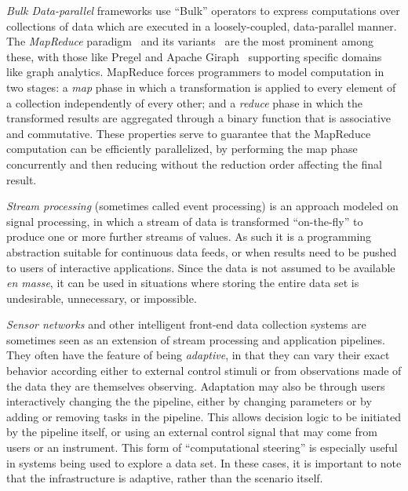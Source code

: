 {\em Bulk Data-parallel} frameworks use ``Bulk'' operators to express
computations over collections of data which are executed in a loosely-coupled,
data-parallel manner.  The {\em MapReduce} paradigm~\cite{MapReduce} and its
variants~\cite{twister,hmr} are the most prominent among these, with those like
Pregel and Apache Giraph~\cite{pregel} supporting specific domains like graph
analytics. MapReduce forces programmers to model computation in two stages: a
\emph{map} phase in which a transformation is applied to every element of a
collection independently of every other; and a \emph{reduce} phase in which the
transformed results are aggregated through a binary function that is associative
and commutative.  These properties serve to guarantee that the MapReduce
computation can be efficiently parallelized, by performing the map phase
concurrently and then reducing without the reduction order affecting the final
result.

{\em Stream processing} (sometimes called event processing) is an approach modeled 
on signal processing, in which a stream of data is transformed ``on-the-fly'' to produce one or
more further streams of values. As such it is a programming
abstraction suitable for continuous data feeds, or when results need
to be pushed to users of interactive applications. Since the data is
not assumed to be available \textit{en masse}, it can be used in
situations where storing the entire data set is undesirable,
unnecessary, or impossible. 

{\em Sensor networks} and other intelligent front-end data collection systems are sometimes seen as an extension of stream processing and application pipelines.
They often have the feature of being \emph{adaptive}, in that they can vary their exact behavior according either to external control stimuli or from observations made of the data they are 
themselves observing. Adaptation may also be through users interactively changing the
the pipeline, either by changing parameters or by adding or removing
tasks in the pipeline. This allows decision logic to be initiated by
the pipeline itself, or using an external control signal that may come
from users or an instrument. This form of ``computational steering''
is especially useful in systems being used to explore a data set. In these cases, it is important to 
note that the infrastructure is adaptive, rather than the scenario itself.



